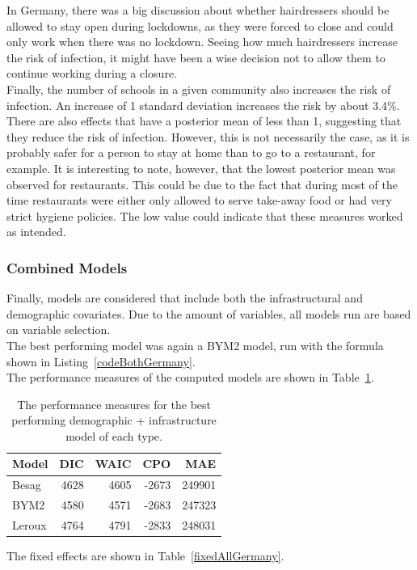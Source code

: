 In Germany, there was a big discussion about whether hairdressers should be allowed to stay open during lockdowns, as they were forced to close and could only work when there was no lockdown. Seeing how much hairdressers increase the risk of infection, it might have been a wise decision not to allow them to continue working during a closure. \\
Finally, the number of schools in a given community also increases the risk of infection. An increase of 1 standard deviation increases the risk by about 3.4\%.
\\
There are also effects that have a posterior mean of less than 1, suggesting that they reduce the risk of infection. However, this is not necessarily the case, as it is probably safer for a person to stay at home than to go to a restaurant, for example. It is interesting to note, however, that the lowest posterior mean was observed for restaurants. This could be due to the fact that during most of the time restaurants were either only allowed to serve take-away food or had very strict hygiene policies. The low value could indicate that these measures worked as intended.
\subsubsection{Combined Models}
Finally, models are considered that include both the infrastructural and demographic covariates. Due to the amount of variables, all models run are based on variable selection. \\
The best performing model was again a BYM2 model, run with the formula shown in Listing~\ref{codeBothGermany}. \\
The performance measures of the computed models are shown in Table~\ref{allGermany}.
\begin{table}[H] 
\caption{The performance measures for the best performing demographic + infrastructure model of each type. \label{allGermany}}
\begin{tabular}{l r r r r}
\toprule
\textbf{Model}	& \textbf{DIC}	& \textbf{WAIC} & \textbf{CPO} & \textbf{MAE}\\
\midrule
Besag&  4628 & 4605 & -2673 & 249901\\
BYM2 & 4580 & 4571 & -2683 & 247323\\
Leroux & 4764 & 4791 & -2833 & 248031 \\
\bottomrule
\end{tabular}
\end{table}
The fixed effects are shown in Table~\ref{fixedAllGermany}.

